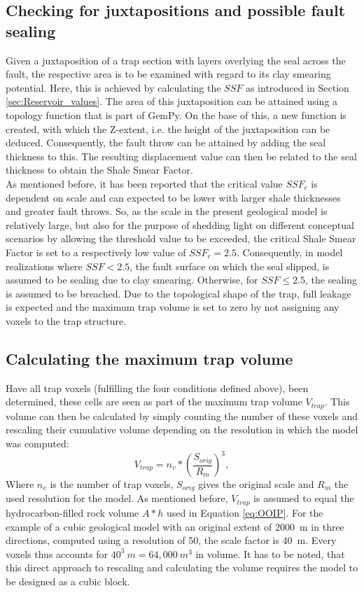 			\subsection{Checking for juxtapositions and possible fault sealing}\label{sec:check_juxta}
			Given a juxtaposition of a trap section with layers overlying the seal across the fault, the respective area is to be examined with regard to its clay smearing potential. Here, this is achieved by calculating the $SSF$ as introduced in Section \ref{sec:Reservoir_values}. The area of this juxtaposition can be attained using a topology function that is part of GemPy. On the base of this, a new function is created, with which the Z-extent, i.e. the height of the juxtaposition can be deduced. Consequently, the fault throw can be attained by adding the seal thickness to this. The resulting displacement value can then be related to the seal thickness to obtain the Shale Smear Factor.\\
			As mentioned before, it has been reported that the critical value $SSF_c$ is dependent on scale and can expected to be lower with larger shale thicknesses and greater fault throws. So, as the scale in the present geological model is relatively large, but also for the purpose of shedding light on different conceptual scenarios by allowing the threshold value to be exceeded, the critical Shale Smear Factor is set to a respectively low value of $SSF_c = 2.5$. Consequently, in model realizations where $SSF < 2.5$, the fault surface on which the seal slipped, is assumed to be sealing due to clay smearing. Otherwise, for $SSF \le 2.5$, the sealing is assumed to be breached. Due to the topological shape of the trap, full leakage is expected and the maximum trap volume is set to zero by not assigning any voxels to the trap structure.
						
			\subsection{Calculating the maximum trap volume}
			Have all trap voxels (fulfilling the four conditions defined above), been determined, these cells are seen as part of the maximum trap volume $V_{trap}$. This volume can then be calculated by simply counting the number of these voxels and rescaling their cumulative volume depending on the resolution in which the model was computed:
			\begin{equation}
			V_{trap} = n_v*(\frac{S_{orig}}{R_{m}})^3,
			\end{equation}
			Where $n_v$ is the number of trap voxels, $S_{orig}$ gives the original scale and $R_m$ the used resolution for the model. As mentioned before, $V_{trap}$ is assumed to equal the hydrocarbon-filled rock volume $A * h$ used in Equation \ref{eq:OOIP}. 
			For the example of a cubic geological model with an original extent of 2000~m in three directions, computed using a resolution of 50, the scale factor is 40~m. Every voxels thus accounts for $40^3~m=64,000~m^3$ in volume. It has to be noted, that this direct approach to rescaling and calculating the volume requires the model to be designed as a cubic block.\\
		
